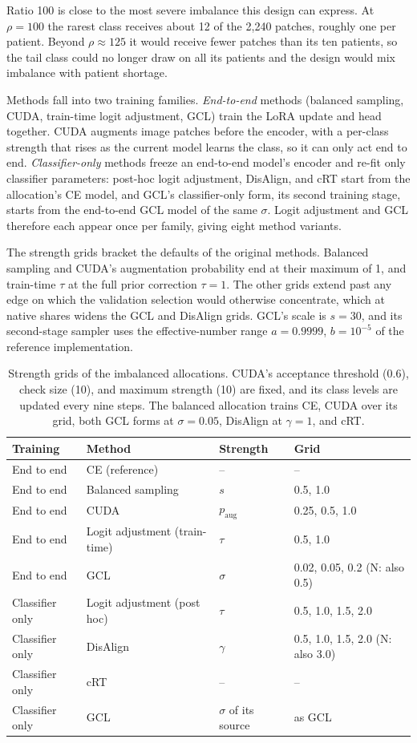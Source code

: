 \documentclass[11pt]{article}
\begin{document}
Ratio 100 is close to the most severe imbalance this design can express. At $\rho=100$ the rarest class receives about 12 of the 2,240 patches, roughly one per patient. Beyond $\rho\approx125$ it would receive fewer patches than its ten patients, so the tail class could no longer draw on all its patients and the design would mix imbalance with patient shortage.

Methods fall into two training families. \emph{End-to-end} methods (balanced sampling, CUDA, train-time logit adjustment, GCL) train the LoRA update and head together. CUDA \citep{ahn2023cuda} augments image patches before the encoder, with a per-class strength that rises as the current model learns the class, so it can only act end to end. \emph{Classifier-only} methods freeze an end-to-end model's encoder and re-fit only classifier parameters: post-hoc logit adjustment, DisAlign, and cRT start from the allocation's CE model, and GCL's classifier-only form, its second training stage, starts from the end-to-end GCL model of the same $\sigma$. Logit adjustment and GCL therefore each appear once per family, giving eight method variants.

The strength grids bracket the defaults of the original methods. Balanced sampling and CUDA's augmentation probability end at their maximum of 1, and train-time $\tau$ at the full prior correction $\tau=1$. The other grids extend past any edge on which the validation selection would otherwise concentrate, which at native shares widens the GCL and DisAlign grids. GCL's scale is $s=30$, and its second-stage sampler uses the effective-number range $a=0.9999$, $b=10^{-5}$ of the reference implementation.

\begin{table}[htbp]
\centering
\small
\renewcommand{\arraystretch}{1.15}
\begin{tabular}{@{}llll@{}}
\toprule
Training & Method & Strength & Grid \\
\midrule
End to end & CE (reference) & -- & -- \\
End to end & Balanced sampling & $s$ & 0.5, 1.0 \\
End to end & CUDA & $p_{\mathrm{aug}}$ & 0.25, 0.5, 1.0 \\
End to end & Logit adjustment (train-time) & $\tau$ & 0.5, 1.0 \\
End to end & GCL & $\sigma$ & 0.02, 0.05, 0.2 (N: also 0.5) \\
Classifier only & Logit adjustment (post hoc) & $\tau$ & 0.5, 1.0, 1.5, 2.0 \\
Classifier only & DisAlign & $\gamma$ & 0.5, 1.0, 1.5, 2.0 (N: also 3.0) \\
Classifier only & cRT & -- & -- \\
Classifier only & GCL & $\sigma$ of its source & as GCL \\
\bottomrule
\end{tabular}
\caption{Strength grids of the imbalanced allocations. CUDA's acceptance threshold (0.6), check size (10), and maximum strength (10) are fixed, and its class levels are updated every nine steps. The balanced allocation trains CE, CUDA over its grid, both GCL forms at $\sigma=0.05$, DisAlign at $\gamma=1$, and cRT.}
\label{tab:grid}
\end{table}
\end{document}
